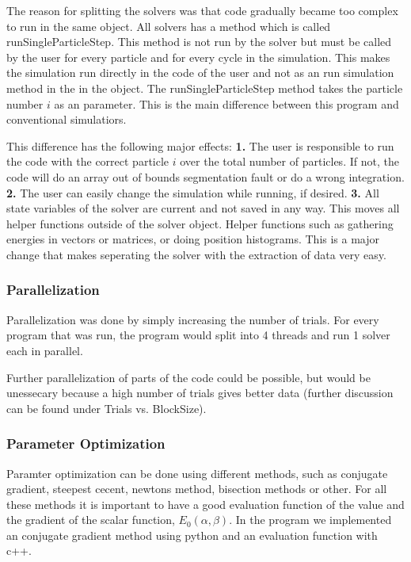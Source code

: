 \documentclass[twocolumn,fleqn,8pt]{article}  %
\begin{document}
The reason for splitting the solvers was that code gradually became too complex
to run in the same object. All solvers has a method which is called
runSingleParticleStep. This method is not run by the solver but must be called
by the user for every particle and for every cycle in the simulation. 
This makes the simulation run directly in the code of the user and not 
as an run simulation method in the in the object. The runSingleParticleStep method
takes the particle number $i$ as an parameter. This is the main difference between
this program and conventional simulatiors. 

This difference has the following major effects: 
{\color{MediumBlue}\bf1.} The user is responsible to run the code with the
correct particle $i$ over the total number of particles. If not, the code will
do an array out of bounds segmentation fault or do a wrong integration.
 {\color{MediumBlue}\bf2.} The user
can easily change the simulation while running, if desired. 
{\color{MediumBlue}\bf3.}
All state variables of the solver are current and not saved in any way. This moves
all helper functions outside of the solver object.
Helper functions such as gathering energies in vectors or matrices, 
or doing position histograms. This is a major change that makes seperating the solver
with the extraction of data very easy. 

\subsubsection{Parallelization}
Parallelization was done by simply increasing the number of trials. For every program
that was run, the program would split into 4 threads and run 1 solver each in parallel.

Further parallelization of parts of the code could be possible, but 
would be unessecary because a high number of trials gives better data
(further discussion can be found under Trials vs. BlockSize). 

\subsubsection{Parameter Optimization}
Paramter optimization can be done using different methods, such as conjugate gradient, 
steepest cecent, newtons method, bisection methods or other. For all these methods
it is important to have a good evaluation function of the value and the gradient of the
scalar function, $E_0(\alpha,\beta)$. In the program we implemented an conjugate gradient
method using python and an evaluation function with c++. 
\end{document}
